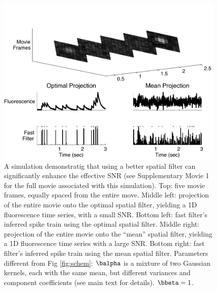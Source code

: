 \begin{figure}
\centering \includegraphics[width=.9\linewidth]{spatial}
\caption{A simulation demonstratig that using a better spatial filter can significantly enhance the effective SNR (see Supplementary Movie 1 for the full movie associated with this simulation).  Top: five movie frames, equally spaced from the entire move.  Middle left: projection of the entire movie onto the optimal spatial filter, yielding a 1D fluorescence time series, with a small SNR. Bottom left: fast filter's inferred spike train using the optimal spatial filter.  Middle right: projection of the entire movie onto the ``mean'' spatial filter, yielding a 1D fluorescence time series with a large SNR. Bottom right: fast filter's inferred spike train using the mean spatial filter. Parameters different from Fig \ref{fig:schem}: $\balpha$ is a mixture of two Gaussian kernels, each with the same mean, but different variances and component coefficients (see main text for details). $\bbeta=1$.} \label{fig:spatial} \end{figure} 

